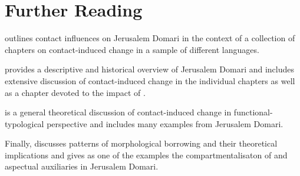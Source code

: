 \documentclass[output=paper]{langsci/langscibook}
\begin{document}
\section*{Further Reading}
\begin{furtherreading}
\item \citet{Matras2007Domari} outlines contact influences on Jerusalem Domari in the context of a collection of chapters on contact-induced change in a sample of different languages. 
\item \citet{Matras2012} provides a descriptive and historical overview of Jerusalem Domari and includes extensive discussion of contact-induced change in the individual chapters as well as a chapter devoted to the impact of . 
\item \citet{Matras2009} is a general theoretical discussion of contact-induced change in functional-typological perspective and includes many examples from Jerusalem Domari. 
\item Finally, \citet{Matras2015} discusses patterns of morphological borrowing and their theoretical implications and gives as one of the examples the compartmentalisaton of  and aspectual auxiliaries in Jerusalem Domari. 
\end{furtherreading}
\end{document}
